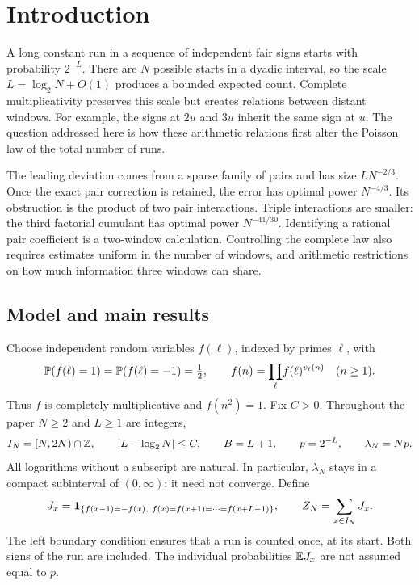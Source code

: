 \section{Introduction}
\label{p1:intro}

A long constant run in a sequence of independent fair signs starts
with probability \(2^{-L}\). There are \(N\) possible starts in a
dyadic interval, so the scale \(L=\log_2 N+O(1)\) produces a bounded
expected count. Complete multiplicativity preserves this scale but
creates relations between distant windows. For example, the signs
at \(2u\) and \(3u\) inherit the same sign at \(u\). The question
addressed here is how these arithmetic relations first alter the
Poisson law of the total number of runs.

The leading deviation comes from a sparse family of pairs and has
size \(L N^{-2/3}\). Once the exact pair correction is retained,
the error has optimal power \(N^{-4/3}\). Its obstruction is the
product of two pair interactions. Triple interactions are smaller:
the third factorial cumulant has optimal power \(N^{-41/30}\).
Identifying a rational pair coefficient is a two-window calculation.
Controlling the complete law also requires estimates uniform in
the number of windows, and arithmetic restrictions on how much
information three windows can share.

\subsection{Model and main results}
\label{p1:intro:model}

Choose independent random variables \(f(\ell)\), indexed by primes
\(\ell\), with
\[
 \P(f(\ell)=1)=\P(f(\ell)=-1)=\tfrac12,
 \qquad
 f(n)=\prod_{\ell}\! f(\ell)^{v_\ell(n)}\quad(n\ge1).
\]
Thus \(f\) is completely multiplicative and \(f(n^2)=1\).
Fix \(C>0\). Throughout the paper \(N\ge2\) and \(L\ge1\) are integers,
\begin{equation}
 I_N=[N,2N)\cap\Z,\qquad
 |L-\log_2 N|\le C,\qquad B=L+1,\qquad
 p=2^{-L},\qquad \lambda_N=Np.
 \label{p1:eq:critical}
\end{equation}
All logarithms without a subscript are natural. In particular,
\(\lambda_N\) stays in a compact subinterval of \((0,\infty)\);
it need not converge. Define
\begin{equation}
 J_x=\ind_{\{f(x-1)=-f(x),\ 
             f(x)=f(x+1)=\cdots=f(x+L-1)\}},
 \qquad Z_N=\sum_{x\in I_N}J_x .
 \label{p1:eq:model}
\end{equation}
The left boundary condition ensures that a run is counted once,
at its start. Both signs of the run are included.
The individual probabilities \(\E J_x\) are not assumed equal to \(p\).

